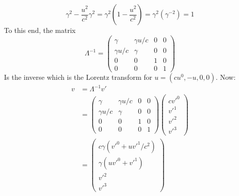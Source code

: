 \documentclass[12pt,a4]{article}
\begin{document}
\begin{enumerate}
\begin{enumerate}
\begin{equation*}
          \gamma^2 - \frac{u^2}{c^2} \gamma ^2 = \gamma^2(1 - \frac{u^2}{c^2}) = \gamma^2 (\gamma^{-2}) = 1
        \end{equation*}
        To this end, the matrix
        \begin{equation*}
          \Lambda^{-1} = \left(\begin{matrix}
                      \gamma         &        \gamma u / c & 0 & 0\\ 
                      \gamma u / c & \gamma                & 0 & 0\\ 
                      0              & 0                     & 1 & 0\\ 
                      0              & 0                     & 0 & 1
                    \end{matrix}\right)
        \end{equation*}
        Is the inverse which is the Lorentz transform for $u = (cu^0, - u, 0, 0)$.
        Now:
        \begin{align*}
          v &= \Lambda^{-1} v'\\
            & = \left(\begin{matrix}
                      \gamma         &        \gamma u / c & 0 & 0\\ 
                      \gamma u / c & \gamma                & 0 & 0\\ 
                      0              & 0                     & 1 & 0\\ 
                      0              & 0                     & 0 & 1
                    \end{matrix}\right)
                  \left(\begin{matrix}
                    c v'^0    \\
                    v'^1    \\
                    v'^2 \\
                    v'^3
                  \end{matrix}\right)\\
            &=              \left(\begin{matrix}
                                c\gamma (v'^0   + u v'^1/ c^2) \\ 
                                \gamma (u v'^0 + v'^1)   \\ 
                                v'^2                \\ 
                                v'^3
                            \end{matrix}\right)\\

\end{align*}
\end{enumerate}
\end{enumerate}
\end{document}
